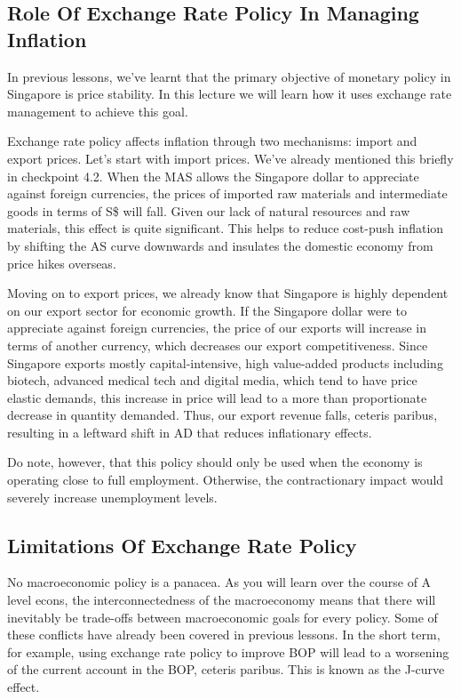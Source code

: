 \documentclass[DIV=calc,11pt,parskip,numbers=noenddot]{scrartcl} %
\begin{document}
\subsection{Role Of Exchange Rate Policy In Managing Inflation}
In previous lessons, we’ve learnt that the primary objective of monetary policy in Singapore is price stability. In this lecture we will learn how it uses exchange rate management to achieve this goal.

Exchange rate policy affects inflation through two mechanisms: import and export prices. Let’s start with import prices. We’ve already mentioned this briefly in checkpoint 4.2. When the MAS allows the Singapore dollar to appreciate against foreign currencies, the prices of imported raw materials and intermediate goods in terms of S\$ will fall. Given our lack of natural resources and raw materials, this effect is quite significant. This helps to reduce cost-push inflation by shifting the AS curve downwards and insulates the domestic economy from price hikes overseas.

Moving on to export prices, we already know that Singapore is highly dependent on our export sector for economic growth. If the Singapore dollar were to appreciate against foreign currencies, the price of our exports will increase in terms of another currency, which decreases our export competitiveness. Since Singapore exports mostly capital-intensive, high value-added products including biotech, advanced medical tech and digital media, which tend to have price elastic demands, this increase in price will lead to a more than proportionate decrease in quantity demanded. Thus, our export revenue falls, ceteris paribus, resulting in a leftward shift in AD that reduces inflationary effects.

Do note, however, that this policy should only be used when the economy is operating close to full employment. Otherwise, the contractionary impact would severely increase unemployment levels.
\subsection{Limitations Of Exchange Rate Policy}
No macroeconomic policy is a panacea. As you will learn over the course of A level econs, the interconnectedness of the macroeconomy means that there will inevitably be trade-offs between macroeconomic goals for every policy. Some of these conflicts have already been covered in previous lessons. In the short term, for example, using exchange rate policy to improve BOP will lead to a worsening of the current account in the BOP, ceteris paribus. This is known as the J-curve effect.
\end{document}
